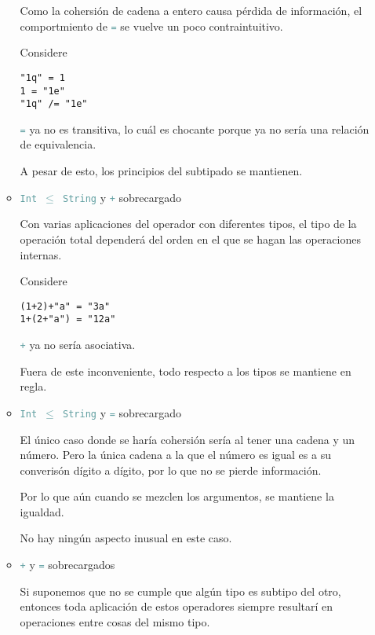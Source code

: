\documentclass{article}
\newcommand{\tp}[1]{\textcolor{CadetBlue} {\texttt{#1}}}
\begin{document}
\begin{enumerate}
\begin{itemize}
            Como la cohersión de cadena a entero causa pérdida de información,
            el comportmiento de \tp{=} se vuelve un poco contraintuitivo.

            Considere

            \begin{verbatim}
"1q" = 1
1 = "1e"
"1q" /= "1e"
            \end{verbatim}

            \tp{=} ya no es transitiva, lo cuál es chocante porque ya no sería 
            una relación de equivalencia.

            A pesar de esto, los principios del  subtipado se mantienen.

            \item \tp{Int $\leq$ String} y \tp{+} sobrecargado

            Con varias aplicaciones del operador con diferentes tipos, el 
            tipo de la operación total dependerá del orden en el que se hagan
            las operaciones internas.

            Considere

            \begin{verbatim}
(1+2)+"a" = "3a"
1+(2+"a") = "12a"
            \end{verbatim}

            \tp{+} ya no sería asociativa.

            Fuera de este inconveniente, todo respecto a los tipos se mantiene
            en regla.

            \item \tp{Int $\leq$ String} y \tp{=} sobrecargado

            El único caso donde se haría cohersión sería al tener una cadena y 
            un número. Pero la única cadena a la que el número es igual es a su 
            converisón dígito a dígito, por lo que no se pierde información.

            Por lo que aún cuando se mezclen los argumentos, se mantiene la 
            igualdad.

            No hay ningún aspecto inusual en este caso.

            \item \tp{+} y \tp{=} sobrecargados

            Si suponemos que no se cumple que algún tipo es subtipo del otro,
            entonces toda aplicación de estos operadores siempre resultarí en 
            operaciones entre cosas del mismo tipo.


\end{itemize}
\end{enumerate}
\end{document}
